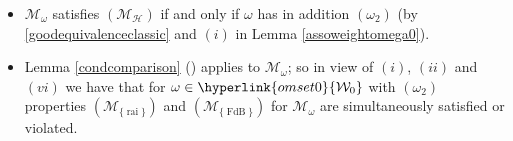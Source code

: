 \documentclass[11pt,a4paper]{article}
\theoremstyle{plain}
\theoremstyle{definition}
\let\on=\operatorname
\begin{document}
\begin{itemize}
	\item[$(vi)$] $\mathcal{M}_{\omega}$ satisfies \hyperlink{holom}{$(\mathcal{M}_{\mathcal{H}})$} if and only if $\omega$ has in addition \hyperlink{om2}{$(\omega_2)$} (by \eqref{goodequivalenceclassic} and $(i)$ in Lemma \ref{assoweightomega0}).
	
	\item[$(vii)$] Lemma \ref{condcomparison} (\cite[Lemma 1]{characterizationstabilitypaper}) applies to $\mathcal{M}_{\omega}$; so in view of $(i)$, $(ii)$ and $(vi)$ we have that for $\omega\in\hyperlink{omset0}{\mathcal{W}_0}$ with \hyperlink{om2}{$(\omega_2)$} properties \hyperlink{R-rai}{$(\mathcal{M}_{\{\on{rai}\}})$} and \hyperlink{R-FdB}{$(\mathcal{M}_{\{\on{FdB}\}})$} for $\mathcal{M}_{\omega}$ are simultaneously satisfied or violated.
\end{itemize}
\end{document}
